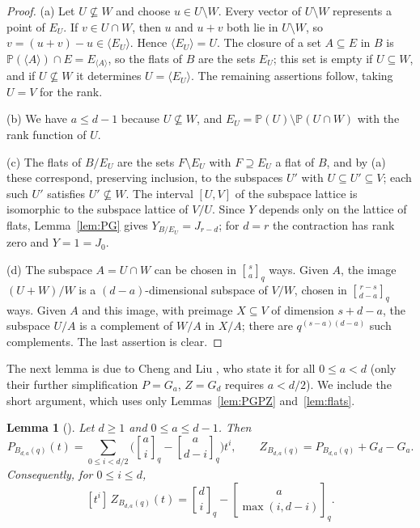 \documentclass{amsart}
\newtheorem{lemma}[theorem]{Lemma}
\theoremstyle{remark}
\numberwithin{equation}{section}
\newcommand{\qbinom}[3]{\genfrac{[}{]}{0pt}{}{#1}{#2}_{#3}}
\newcommand{\PP}{\mathbb{P}}
\begin{document}
\begin{proof}
(a) Let $U\not\subseteq W$ and choose $u\in U\setminus W$. Every vector of $U\setminus W$ represents a point of $E_U$. If $v\in U\cap W$, then $u$ and $u+v$ both lie in $U\setminus W$, so $v=(u+v)-u\in\langle E_U\rangle$. Hence $\langle E_U\rangle=U$. The closure of a set $A\subseteq E$ in $B$ is $\PP(\langle A\rangle)\cap E=E_{\langle A\rangle}$, so the flats of $B$ are the sets $E_U$; this set is empty if $U\subseteq W$, and if $U\not\subseteq W$ it determines $U=\langle E_U\rangle$. The remaining assertions follow, taking $U=V$ for the rank.

(b) We have $a\le d-1$ because $U\not\subseteq W$, and $E_U=\PP(U)\setminus\PP(U\cap W)$ with the rank function of $U$.

(c) The flats of $B/E_U$ are the sets $F\setminus E_U$ with $F\supseteq E_U$ a flat of $B$, and by (a) these correspond, preserving inclusion, to the subspaces $U'$ with $U\subseteq U'\subseteq V$; each such $U'$ satisfies $U'\not\subseteq W$. The interval $[U,V]$ of the subspace lattice is isomorphic to the subspace lattice of $V/U$. Since $Y$ depends only on the lattice of flats, Lemma~\ref{lem:PG} gives $Y_{B/E_U}=J_{r-d}$; for $d=r$ the contraction has rank zero and $Y=1=J_0$.

(d) The subspace $A=U\cap W$ can be chosen in $\qbinom{s}{a}{q}$ ways. Given $A$, the image $(U+W)/W$ is a $(d-a)$-dimensional subspace of $V/W$, chosen in $\qbinom{r-s}{d-a}{q}$ ways. Given $A$ and this image, with preimage $X\subseteq V$ of dimension $s+d-a$, the subspace $U/A$ is a complement of $W/A$ in $X/A$; there are $q^{(s-a)(d-a)}$ such complements. The last assertion is clear.
\end{proof}

The next lemma is due to Cheng and Liu \cite[Remark~2.7]{CL}, who state it for all $0\le a<d$ (only their further simplification $P=G_a$, $Z=G_d$ requires $a<d/2$). We include the short argument, which uses only Lemmas~\ref{lem:PGPZ} and~\ref{lem:flats}.

\begin{lemma}[{\cite[Remark~2.7]{CL}}]\label{lem:CL}
Let $d\ge1$ and $0\le a\le d-1$. Then
\[
  P_{B_{d,a}(q)}(t)=\sum_{0\le i<d/2}\biggl(\qbinom{a}{i}{q}-\qbinom{a}{d-i}{q}\biggr)t^i,\qquad
  Z_{B_{d,a}(q)}=P_{B_{d,a}(q)}+G_d-G_a .
\]
Consequently, for $0\le i\le d$,
\begin{equation}\label{eq:Zcoef}
  [t^i]\,Z_{B_{d,a}(q)}(t)=\qbinom{d}{i}{q}-\qbinom{a}{\max(i,d-i)}{q}.
\end{equation}
\end{lemma}
\end{document}
